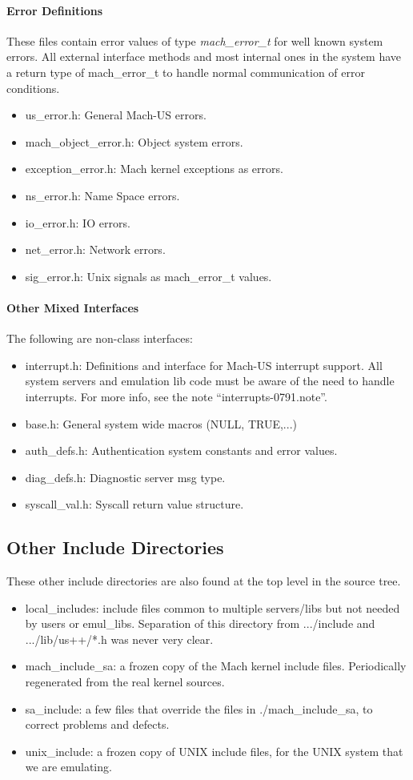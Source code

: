 \paragraph{Error Definitions}
These files contain error values of type {\em mach\_error\_t}
for well known system errors.  All external interface
methods and most internal ones
in the system have a return type of mach\_error\_t to handle normal
communication of error conditions.
\begin{itemize}
\item{us\_error.h}: General Mach-US errors.
\item{mach\_object\_error.h}: Object system errors.
\item{exception\_error.h}: Mach kernel exceptions as errors.
\item{ns\_error.h}: Name Space errors.
\item{io\_error.h}: IO errors.
\item{net\_error.h}: Network errors.
\item{sig\_error.h}: Unix signals as mach\_error\_t values.
\end{itemize}

\paragraph{Other Mixed Interfaces}
The following are non-class interfaces:
\begin{itemize}
\item{interrupt.h}: Definitions and interface for Mach-US interrupt support.
All system servers and emulation lib code must be aware of the need
to handle interrupts.  For more info, see the note ``interrupts-0791.note''.
\item{base.h}: General system wide macros (NULL, TRUE,...)
\item{auth\_defs.h}: Authentication system constants and error values.
\item{diag\_defs.h}: Diagnostic server msg type.
\item{syscall\_val.h}: Syscall return value structure.
\end{itemize}


\subsection{Other Include Directories}
These other include directories are also found at the top level in the source
tree.
\begin{itemize}
\item{local\_includes}: include files common to multiple servers/libs but
not needed by users or emul\_libs.  
Separation of this directory from .../include
and .../lib/us++/*.h was never very clear.
\item{mach\_include\_sa}: a frozen copy of the Mach kernel include files.
Periodically regenerated from the real kernel sources.
\item{sa\_include}: a few files that override the files in
./mach\_include\_sa, to correct problems and defects.
\item{unix\_include}: a frozen copy of UNIX include files, for the
UNIX system that we are emulating.
\end{itemize}

